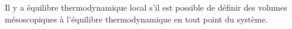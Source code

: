 ﻿\documentclass[a4paper]{article}
\begin{document}
\pagestyle{fancy}
\fancyhf{}
\setlength{\headheight}{15pt}

\begin{center}
	\large{}
\end{center}


Il y a équilibre thermodynamique local s'il est possible de définir des volumes mésoscopiques à l'équilibre thermodynamique en tout point du système.
\end{document}
